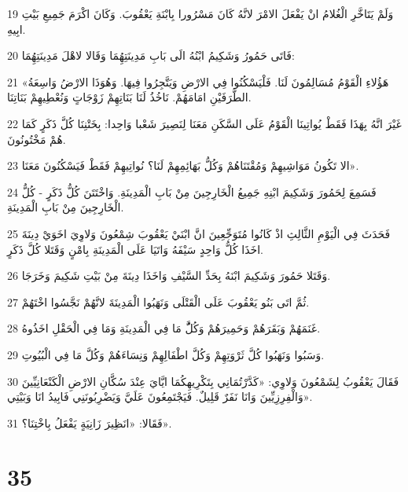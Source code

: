 \par 19 وَلَمْ يَتَاخَّرِ الْغُلامُ انْ يَفْعَلَ الامْرَ لانَّهُ كَانَ مَسْرُورا بِابْنَةِ يَعْقُوبَ. وَكَانَ اكْرَمَ جَمِيعِ بَيْتِ ابِيهِ.
\par 20 فَاتَى حَمُورُ وَشَكِيمُ ابْنُهُ الَى بَابِ مَدِينَتِهُِمَا وَقَالا لاهْلَ مَدِينَتِهُِمَا:
\par 21 «هَؤُلاءِ الْقَوْمُ مُسَالِمُونَ لَنَا. فَلْيَسْكُنُوا فِي الارْضِ وَيَتَّجِرُوا فِيهَا. وَهُوَذَا الارْضُ وَاسِعَةُ الطَّرَفَيْنِ امَامَهُمْ. نَاخُذُ لَنَا بَنَاتِهِمْ زَوْجَاتٍ وَنُعْطِيهِمْ بَنَاتِنَا.
\par 22 غَيْرَ انَّهُ بِهَذَا فَقَطْ يُواتِينَا الْقَوْمُ عَلَى السَّكَنِ مَعَنَا لِنَصِيرَ شَعْبا وَاحِدا: بِخَتْنِنَا كُلَّ ذَكَرٍ كَمَا هُمْ مَخْتُونُونَ.
\par 23 الا تَكُونُ مَوَاشِيهِمْ وَمُقْتَنَاهُمْ وَكُلُّ بَهَائِمِهِمْ لَنَا؟ نُواتِيهِمْ فَقَطْ فَيَسْكُنُونَ مَعَنَا».
\par 24 فَسَمِعَ لِحَمُورَ وَشَكِيمَ ابْنِهِ جَمِيعُ الْخَارِجِينَ مِنْ بَابِ الْمَدِينَةِ. وَاخْتَتَنَ كُلُّ ذَكَرٍ - كُلُّ الْخَارِجِينَ مِنْ بَابِ الْمَدِينَةِ.
\par 25 فَحَدَثَ فِي الْيَوْمِ الثَّالِثِ اذْ كَانُوا مُتَوَجِّعِينَ انَّ ابْنَيْ يَعْقُوبَ شِمْعُونَ وَلاوِيَ اخَوَيْ دِينَةَ اخَذَا كُلُّ وَاحِدٍ سَيْفَهُ وَاتَيَا عَلَى الْمَدِينَةِ بِامْنٍ وَقَتَلا كُلَّ ذَكَرٍ.
\par 26 وَقَتَلا حَمُورَ وَشَكِيمَ ابْنَهُ بِحَدِّ السَّيْفِ وَاخَذَا دِينَةَ مِنْ بَيْتِ شَكِيمَ وَخَرَجَا.
\par 27 ثُمَّ اتَى بَنُو يَعْقُوبَ عَلَى الْقَتْلَى وَنَهَبُوا الْمَدِينَةَ لانَّهُمْ نَجَّسُوا اخْتَهُمْ.
\par 28 غَنَمَهُمْ وَبَقَرَهُمْ وَحَمِيرَهُمْ وَكُلَُّ مَا فِي الْمَدِينَةِ وَمَا فِي الْحَقْلِ اخَذُوهُ.
\par 29 وَسَبُوا وَنَهَبُوا كُلَّ ثَرْوَتِهِمْ وَكُلَّ اطْفَالِهِمْ وَنِسَاءَهُمْ وَكُلَّ مَا فِي الْبُيُوتِ.
\par 30 فَقَالَ يَعْقُوبُ لِشَمْعُونَ وَلاوِي: «كَدَّرْتُمَانِي بِتَكْرِيهِكُمَا ايَّايَ عِنْدَ سُكَّانِ الارْضِ الْكَنْعَانِيِّينَ وَالْفِرِزِيِّينَ وَانَا نَفَرٌ قَلِيلٌ. فَيَجْتَمِعُونَ عَلَيَّ وَيَضْرِبُونَنِي فَابِيدُ انَا وَبَيْتِي».
\par 31 فَقَالا: «انَظِيرَ زَانِيَةٍ يَفْعَلُ بِاخْتِنَا؟».

\chapter{35}

